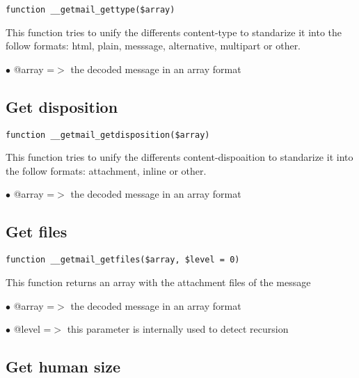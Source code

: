 \documentclass[a4paper]{book}
\begin{document}
\begin{lstlisting}
function __getmail_gettype($array)
\end{lstlisting}

This function tries to unify the differents content-type to standarize it into
the follow formats: html, plain, messsage, alternative, multipart or other.

\begin{compactitem}
\item[\color{myblue}$\bullet$] @array =$>$ the decoded message in an array format
\end{compactitem}

\hypertarget{toc42}{}
\subsection{Get disposition}

\begin{lstlisting}
function __getmail_getdisposition($array)
\end{lstlisting}

This function tries to unify the differents content-dispoaition to standarize
it into the follow formats: attachment, inline or other.

\begin{compactitem}
\item[\color{myblue}$\bullet$] @array =$>$ the decoded message in an array format
\end{compactitem}

\hypertarget{toc43}{}
\subsection{Get files}

\begin{lstlisting}
function __getmail_getfiles($array, $level = 0)
\end{lstlisting}

This function returns an array with the attachment files of the message

\begin{compactitem}
\item[\color{myblue}$\bullet$] @array =$>$ the decoded message in an array format
\item[\color{myblue}$\bullet$] @level =$>$ this parameter is internally used to detect recursion
\end{compactitem}

\hypertarget{toc44}{}
\subsection{Get human size}
\end{document}
